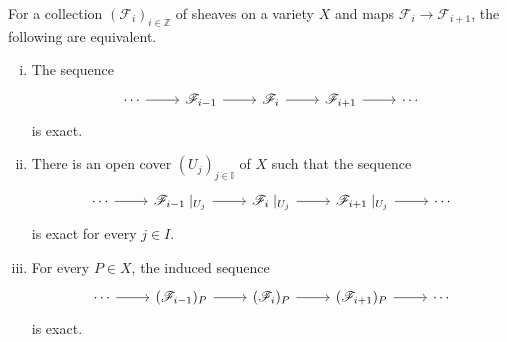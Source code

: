 \begin{thm}\label{thm:ses_equivalence}
  For a collection $(\mathscr{F}_{i})_{i\in\mathbb{Z}}$ of sheaves on
  a variety $X$ and maps ${\mathscr{F}_{i}\to\mathscr{F}_{i+1}}$,
  the following are equivalent.
  \begin{enumerate}[(i)]
    \item The sequence
          \[
          \begin{tikzcd}
            \cdots \rar & \mathscr{F}_{i-1}\rar
            & \mathscr{F}_{i}\rar & \mathscr{F}_{i+1}\rar & \cdots
          \end{tikzcd}
          \]
          is exact.
    \item There is an open cover $(U_{j})_{j\in\mathbb{I}}$ of $X$ such that
          the sequence
          \[
          \begin{tikzcd}
            \cdots \rar & \mathscr{F}_{i-1}\mid_{U_{j}}\rar
            & \mathscr{F}_{i}\mid_{U_{j}}\rar
            & \mathscr{F}_{i+1}\mid_{U_{j}}\rar & \cdots
          \end{tikzcd}
          \]
          is exact for every $j\in I$.
    \item For every $P\in X$, the induced sequence
          \[
          \begin{tikzcd}
            \cdots \rar & (\mathscr{F}_{i-1})_{P}\rar
            & (\mathscr{F}_{i})_{P}\rar
            & (\mathscr{F}_{i+1})_{P}\rar & \cdots
          \end{tikzcd}
          \]
          is exact.
  \end{enumerate}
\end{thm}
